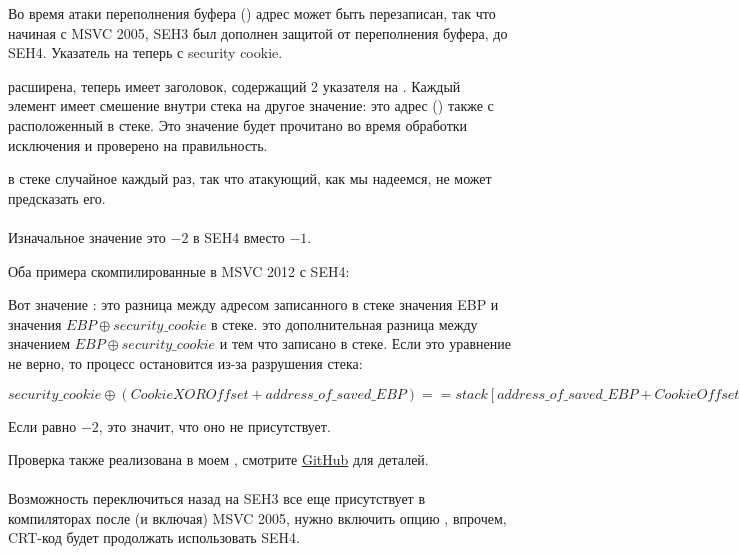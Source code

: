 \myindex{\BufferOverflow}
Во время атаки переполнения буфера ()
адрес  может быть перезаписан, так что начиная с MSVC 2005, SEH3 был дополнен защитой от переполнения буфера, до SEH4.
Указатель на  теперь  с \gls{security cookie}.

 расширена, теперь имеет заголовок, содержащий 2 указателя на .
Каждый элемент имеет смешение внутри стека на другое значение: это адрес  (\EBP) также  с 
 расположенный в стеке.
Это значение будет прочитано во время обработки исключения и проверено на правильность.

 в стеке случайное каждый раз, так что атакующий, как мы надеемся, не может предсказать его.\\
\\
Изначальное значение  это $-2$ в SEH4 вместо $-1$.

\def\SEHfour{1}


Оба примера скомпилированные в MSVC 2012 с SEH4:





Вот значение :  
это разница между адресом записанного в стеке значения EBP и значения $EBP \oplus security\_cookie$ в стеке.
 это дополнительная разница между значением $EBP \oplus security\_cookie$ и тем что записано в стеке.
Если это уравнение не верно, то процесс остановится из-за разрушения стека:

\begin{center}
$security\_cookie \oplus (CookieXOROffset + address\_of\_saved\_EBP) == stack[address\_of\_saved\_EBP + CookieOffset]$
\end{center}

Если  равно $-2$, это значит, что оно не присутствует.

Проверка  также реализована в моем \tracer{},
смотрите \href{http://go.yurichev.com/17061}{GitHub} для деталей.\\
\\
Возможность переключиться назад на SEH3 все еще присутствует в компиляторах после (и включая) MSVC 2005, нужно включить
опцию , впрочем, \ac{CRT}-код будет продолжать использовать SEH4.

